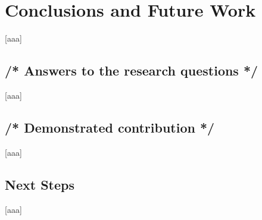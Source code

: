 \chapter{Conclusions and Future Work} \label{sec:Conclusions and Future Work}
    [aaa]

\section{/* Answers to the research questions */} \label{sec:/* Answers to the research questions */}
    [aaa]

\section{/* Demonstrated contribution */} \label{sec:/* Demonstrated contribution */}
    [aaa]

\section{Next Steps} \label{sec:Next Steps}
    [aaa]
